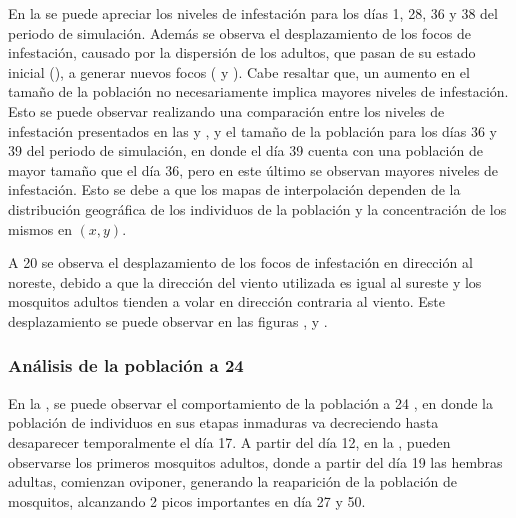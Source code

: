 En la  se puede apreciar los niveles de infestación para los
días 1, 28, 36 y 38 del periodo de simulación. Además se observa el desplazamiento de los focos de
infestación, causado por la dispersión de los adultos, que pasan de su estado inicial
(), a generar nuevos focos
( y ). Cabe resaltar
que, un aumento en el tamaño de la población no necesariamente implica mayores niveles de
infestación. Esto se puede observar realizando una comparación entre los niveles de infestación
presentados en las  y ,
y el tamaño de la población para los días 36 y 39 del periodo de simulación, en donde el día 39
cuenta con una población de mayor tamaño que el día 36, pero en este último se observan mayores
niveles de infestación. Esto se debe a que los mapas de interpolación dependen de la distribución
geográfica de los individuos de la población y la concentración de los mismos en $(x,y)$.

A 20 \textcelsius se observa el desplazamiento de los focos de infestación en dirección al
noreste, debido a que la dirección del viento utilizada es igual al sureste y los mosquitos
adultos tienden a volar en dirección contraria al viento. Este desplazamiento se puede observar en
las figuras ,  y
.

\subsubsection{Análisis de la población a 24\textcelsius}
En la , se puede observar el comportamiento de la población a
24 \textcelsius, en donde la población de individuos en sus etapas inmaduras va decreciendo hasta
desaparecer temporalmente el día 17. A partir del día 12, en la
, pueden observarse los primeros mosquitos adultos, donde a
partir del día 19 las hembras adultas, comienzan oviponer, generando la reaparición de la
población de mosquitos, alcanzando 2 picos importantes en día 27 y 50.

